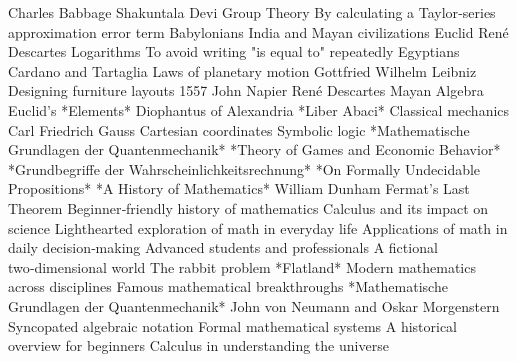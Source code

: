 \answerkey
{} Charles Babbage
 Shakuntala Devi
 Group Theory
 By calculating a Taylor‑series approximation error term
 Babylonians
 India and Mayan civilizations
 Euclid
 René Descartes
 Logarithms
 To avoid writing "is equal to" repeatedly
 Egyptians
 Cardano and Tartaglia
 Laws of planetary motion
 Gottfried Wilhelm Leibniz
 Designing furniture layouts
 1557
 John Napier
 René Descartes
 Mayan
 Algebra
 Euclid's *Elements*
 Diophantus of Alexandria
 *Liber Abaci*
 Classical mechanics
 Carl Friedrich Gauss
 Cartesian coordinates
 Symbolic logic
 *Mathematische Grundlagen der Quantenmechanik*
 *Theory of Games and Economic Behavior*
 *Grundbegriffe der Wahrscheinlichkeitsrechnung*
 *On Formally Undecidable Propositions*
 *A History of Mathematics*
 William Dunham
 Fermat's Last Theorem
 Beginner‑friendly history of mathematics
 Calculus and its impact on science
 Lighthearted exploration of math in everyday life
 Applications of math in daily decision‑making
 Advanced students and professionals
 A fictional two‑dimensional world
 The rabbit problem
 *Flatland*
 Modern mathematics across disciplines
 Famous mathematical breakthroughs
 *Mathematische Grundlagen der Quantenmechanik*
 John von Neumann and Oskar Morgenstern
 Syncopated algebraic notation
 Formal mathematical systems
 A historical overview for beginners
 Calculus in understanding the universe
\endanswerkey